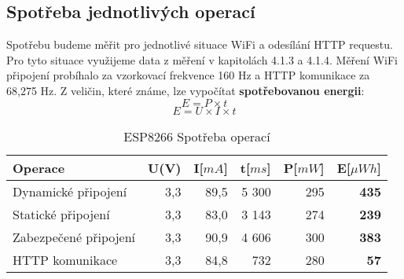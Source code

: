 \documentclass[a4paper, 12pt]{report}
\begin{document}

			\subsection{Spotřeba jednotlivých operací}
				Spotřebu budeme měřit pro jednotlivé situace WiFi a odesílání HTTP requestu. Pro tyto situace využijeme data z měření v kapitolách 4.1.3 a 4.1.4. Měření WiFi připojení probíhalo za vzorkovací frekvence 160 Hz a HTTP komunikace za 68,275 Hz. Z veličin, které známe, lze vypočítat \textbf{spotřebovanou energii}:
				$$E = P \times t$$
				$$E = U \times I \times t$$

				\begin{table}[h]
					\centering
					\caption{ESP8266 Spotřeba operací}
					\begin{tabular}{||l| r r r r |r||}
						\hline
						Operace & U(V) & I[$mA$] & t[$ms$] & P[$mW$] & \textbf{E}[$\mu Wh$]\\
						\hline
						\hline
					Dynamické připojení & 3,3 & 89,5 & 5 300 & 295 & \textbf{435}\\
					Statické připojení & 3,3 & 83,0 & 3 143 & 274 & \textbf{239}\\
					Zabezpečené připojení & 3,3 & 90,9 & 4 606 & 300 & \textbf{383}\\
					HTTP komunikace & 3,3 & 84,8 & 732 & 280 & \textbf{57}\\
					\hline
					\end{tabular}
					\label{Spotreba_operaci}
				\end{table}
\end{document}
